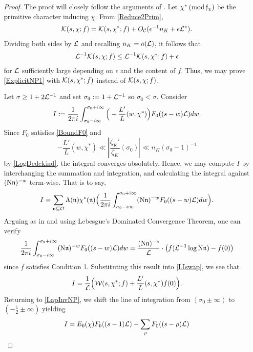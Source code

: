 \documentclass[12pt,psamsfonts]{amsart}
\theoremstyle{definition}
\theoremstyle{remark}
\numberwithin{equation}{section}
\begin{document}
\begin{proof} The proof will closely follow the arguments of \cite[Lemma 5.2]{HBLinnik}. Let $\chi^* \, (\mathrm{mod} {\, \mathfrak{f}_{\chi}})$ be the primitive character inducing $\chi$. From \cref{Reduce2Prim}, 
\[
\mathcal{K}(s,\chi; f) = \mathcal{K}(s, \chi^*; f) + O_{\mathcal{C}}( \epsilon^{-1} n_K  + \epsilon \mathcal{L}^*).
\]
Dividing both sides by $\mathcal{L}$ and recalling $n_K = o(\mathcal{L})$, it follows that
\[
\mathcal{L}^{-1} \mathcal{K}(s,\chi; f) \leq \mathcal{L}^{-1} \mathcal{K}(s, \chi^*; f) + \epsilon
\]
for $\mathcal{L}$ sufficiently large depending on $\epsilon$ and the content of $f$.  Thus, we may prove \eqref{ExplicitNP1} with $\mathcal{K}(s, \chi^*; f)$ instead of $\mathcal{K}(s, \chi; f)$.


Let $\sigma \geq 1+2\mathcal{L}^{-1}$ and set $\sigma_0 := 1+\mathcal{L}^{-1}$ so $\sigma_0 < \sigma$. Consider
\begin{equation}
I := \frac{1}{2\pi i} \int_{\sigma_0 -i\infty}^{\sigma_0+i\infty} \Big( -\frac{L'}{L}(w, \chi^*) \Big) F_0((s-w)\mathcal{L}) dw. 
\label{LapInvNP}
\end{equation}
Since $F_0$ satisfies \eqref{BoundF0} and 
\[
-\frac{L'}{L}(w,\chi^*) \ll |\frac{\zeta_K'}{\zeta_K}(\sigma_0)| \ll n_K (\sigma_0-1)^{-1}
\]
by \cref{LogDedekind},  the integral converges absolutely. Hence, we may compute $I$ by interchanging the summation and integration, and calculating the integral against $(\mathrm{N}\mathfrak{n})^{-w}$ term-wise. That is to say,
\begin{equation}
I = \sum_{\mathfrak{n} \subseteq \mathcal{O}} \Lambda(\mathfrak{n}) \chi^*(\mathfrak{n}) \Big( \frac{1}{2\pi i} \int_{\sigma_0-i\infty}^{\sigma_0+i\infty} (\mathrm{N} \mathfrak{n})^{-w} F_0( (s-w)\mathcal{L}) dw \Big). 
\label{LIswap}
\end{equation}
Arguing as in \cite[Section 5, p.21]{HBLinnik} and using Lebesgue's Dominated Convergence Theorem, one can verify
\[
\frac{1}{2\pi i} \int_{\sigma_0-i\infty}^{\sigma_0+i\infty} (\mathrm{N} \mathfrak{n})^{-w} F_0( (s-w)\mathcal{L}) dw = \frac{(\mathrm{N} \mathfrak{n})^{-s}}{\mathcal{L}} \cdot \big( f(\mathcal{L}^{-1} \log \mathrm{N}\mathfrak{n}) - f(0) \big)
\]
since $f$ satisfies Condition 1.   Substituting this result into \eqref{LIswap}, we see that
\begin{equation}
I = \frac{1}{\mathcal{L}} \Big( \mathcal{W}(s, \chi^*; f)  + \frac{L'}{L}(s,\chi^*) f(0) \Big). 
\label{LapInv1}
\end{equation}
Returning to \eqref{LapInvNP}, we shift the line of integration from $(\sigma_0 \pm \infty)$ to $(-\frac{1}{2} \pm \infty)$ yielding
\begin{equation}
\begin{aligned}
I & =  E_0(\chi) F_0((s-1)\cL) - \sum_{\rho} F_0((s-\rho) \cL)  \\

\end{aligned}
\end{equation}
\end{proof}
\end{document}
